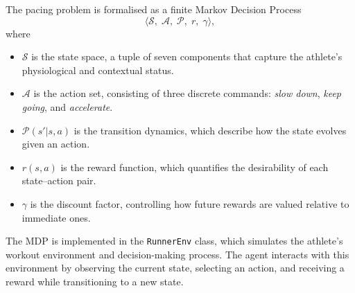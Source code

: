 The pacing problem is formalised as a finite Markov Decision Process  
\[
\langle \mathcal{S},\; \mathcal{A},\; \mathcal{P},\; r,\; \gamma \rangle,
\]
where  
\begin{itemize}
  \item \(\mathcal{S}\) is the state space, a tuple of seven components that capture the athlete’s physiological and contextual status.
  \item \(\mathcal{A}\) is the action set, consisting of three discrete commands: \emph{slow down}, \emph{keep going}, and \emph{accelerate}.
  \item \(\mathcal{P}(s'|s,a)\) is the transition dynamics, which describe how the state evolves given an action.
  \item \(r(s,a)\) is the reward function, which quantifies the desirability of each state–action pair.
  \item \(\gamma\) is the discount factor, controlling how future rewards are valued relative to immediate ones.
\end{itemize}

The MDP is implemented in the \texttt{RunnerEnv} class, which simulates the athlete's workout environment and decision-making process. The agent interacts with this environment by observing the current state, selecting an action, and receiving a reward while transitioning to a new state.


